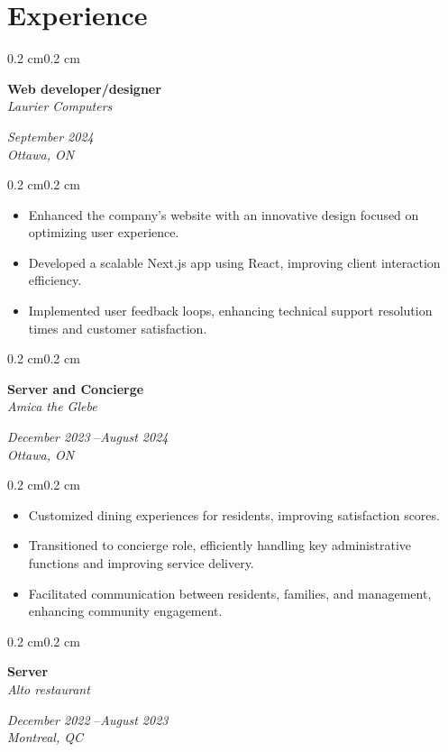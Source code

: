\documentclass[10pt, letterpaper]{article}
\newenvironment{highlights}{%
    \begin{itemize}[
        topsep=0.10 cm,%
        parsep=0.10 cm,%
        partopsep=0pt,%
        itemsep=0pt,%
        leftmargin=0.4 cm + 10pt%
    ]
}{%
    \end{itemize}%
}
\newenvironment{onecolentry}{%
    \begin{adjustwidth}{0.2 cm}{0.2 cm}%
}{%
    \end{adjustwidth}%
}
\newenvironment{twocolentry}[1]{%
    \begin{onecolentry}%
    \def\twocolentryarg{#1}%
    \noindent
    \begin{minipage}[t]{0.68\textwidth} %
}{%
    \end{minipage}\hfill%
    \begin{minipage}[t]{0.30\textwidth} %
      \raggedleft\twocolentryarg
    \end{minipage}%
    \vspace{0.2cm}%
    \end{onecolentry}%
}
\begin{document}
\section{Experience}
\begin{twocolentry}{%
\textit{September 2024 }\textit{} \\[0.1cm]
\textit{Ottawa, ON}%
}
    \textbf{Web developer/designer }\\
    \textit{Laurier Computers }
\end{twocolentry}
\vspace{0.10 cm}
\begin{onecolentry}
    \begin{highlights}
        \item Enhanced the company’s website with an innovative design focused on optimizing user experience.
        \item Developed a scalable Next.js app using React, improving client interaction efficiency.
        \item Implemented user feedback loops, enhancing technical support resolution times and customer satisfaction.
    \end{highlights}
\end{onecolentry}
\vspace{0.2 cm}
\begin{twocolentry}{%
\textit{December 2023 }--\textit{August 2024} \\[0.1cm]
\textit{Ottawa, ON}%
}
    \textbf{Server and Concierge }\\
    \textit{Amica the Glebe }
\end{twocolentry}
\vspace{0.10 cm}
\begin{onecolentry}
    \begin{highlights}
        \item Customized dining experiences for residents, improving satisfaction scores.
        \item Transitioned to concierge role, efficiently handling key administrative functions and improving service delivery.
        \item Facilitated communication between residents, families, and management, enhancing community engagement.
    \end{highlights}
\end{onecolentry}
\vspace{0.2 cm}
\begin{twocolentry}{%
\textit{December 2022 }--\textit{August 2023} \\[0.1cm]
\textit{Montreal, QC}%
}
    \textbf{Server }\\
    \textit{Alto restaurant }
\end{twocolentry}
\end{document}
